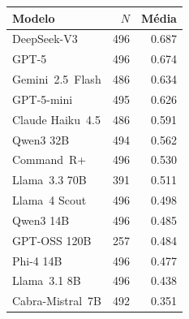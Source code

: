 \begin{tabular}{lrr}
\toprule
Modelo & $N$ & Média \\
\midrule
DeepSeek-V3      & 496 & 0.687 \\
GPT-5            & 496 & 0.674 \\
Gemini~2.5~Flash & 486 & 0.634 \\
GPT-5-mini       & 495 & 0.626 \\
Claude Haiku~4.5 & 486 & 0.591 \\
Qwen3 32B        & 494 & 0.562 \\
Command~R+       & 496 & 0.530 \\
Llama~3.3 70B    & 391 & 0.511 \\
Llama~4 Scout    & 496 & 0.498 \\
Qwen3 14B        & 496 & 0.485 \\
GPT-OSS 120B     & 257 & 0.484 \\
Phi-4 14B        & 496 & 0.477 \\
Llama~3.1 8B     & 496 & 0.438 \\
Cabra-Mistral~7B & 492 & 0.351 \\
\bottomrule
\end{tabular}
